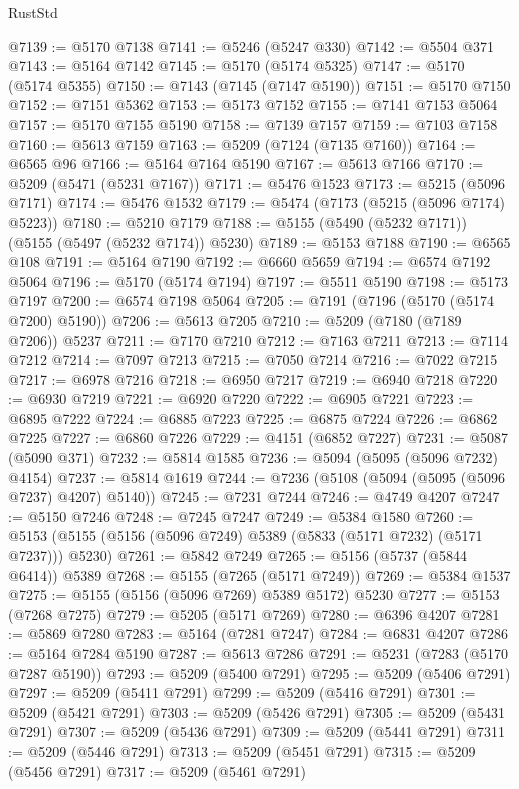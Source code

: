 \begin{lexlean}{RustStd}
\begin{coremodule}
@7139 := @5170 @7138
@7141 := @5246 (@5247 @330)
@7142 := @5504 @371
@7143 := @5164 @7142
@7145 := @5170 (@5174 @5325)
@7147 := @5170 (@5174 @5355)
@7150 := @7143 (@7145 (@7147 @5190))
@7151 := @5170 @7150
@7152 := @7151 @5362
@7153 := @5173 @7152
@7155 := @7141 @7153 @5064
@7157 := @5170 @7155 @5190
@7158 := @7139 @7157
@7159 := @7103 @7158
@7160 := @5613 @7159
@7163 := @5209 (@7124 (@7135 @7160))
@7164 := @6565 @96
@7166 := @5164 @7164 @5190
@7167 := @5613 @7166
@7170 := @5209 (@5471 (@5231 @7167))
@7171 := @5476 @1523
@7173 := @5215 (@5096 @7171)
@7174 := @5476 @1532
@7179 := @5474 (@7173 (@5215 (@5096 @7174) @5223))
@7180 := @5210 @7179
@7188 := @5155 (@5490 (@5232 @7171)) (@5155 (@5497 (@5232 @7174)) @5230)
@7189 := @5153 @7188
@7190 := @6565 @108
@7191 := @5164 @7190
@7192 := @6660 @5659
@7194 := @6574 @7192 @5064
@7196 := @5170 (@5174 @7194)
@7197 := @5511 @5190
@7198 := @5173 @7197
@7200 := @6574 @7198 @5064
@7205 := @7191 (@7196 (@5170 (@5174 @7200) @5190))
@7206 := @5613 @7205
@7210 := @5209 (@7180 (@7189 @7206)) @5237
@7211 := @7170 @7210
@7212 := @7163 @7211
@7213 := @7114 @7212
@7214 := @7097 @7213
@7215 := @7050 @7214
@7216 := @7022 @7215
@7217 := @6978 @7216
@7218 := @6950 @7217
@7219 := @6940 @7218
@7220 := @6930 @7219
@7221 := @6920 @7220
@7222 := @6905 @7221
@7223 := @6895 @7222
@7224 := @6885 @7223
@7225 := @6875 @7224
@7226 := @6862 @7225
@7227 := @6860 @7226
@7229 := @4151 (@6852 @7227)
@7231 := @5087 (@5090 @371)
@7232 := @5814 @1585
@7236 := @5094 (@5095 (@5096 @7232) @4154)
@7237 := @5814 @1619
@7244 := @7236 (@5108 (@5094 (@5095 (@5096 @7237) @4207) @5140))
@7245 := @7231 @7244
@7246 := @4749 @4207
@7247 := @5150 @7246
@7248 := @7245 @7247
@7249 := @5384 @1580
@7260 := @5153 (@5155 (@5156 (@5096 @7249) @5389 (@5833 (@5171 @7232) (@5171 @7237))) @5230)
@7261 := @5842 @7249
@7265 := @5156 (@5737 (@5844 @6414)) @5389
@7268 := @5155 (@7265 (@5171 @7249))
@7269 := @5384 @1537
@7275 := @5155 (@5156 (@5096 @7269) @5389 @5172) @5230
@7277 := @5153 (@7268 @7275)
@7279 := @5205 (@5171 @7269)
@7280 := @6396 @4207
@7281 := @5869 @7280
@7283 := @5164 (@7281 @7247)
@7284 := @6831 @4207
@7286 := @5164 @7284 @5190
@7287 := @5613 @7286
@7291 := @5231 (@7283 (@5170 @7287 @5190))
@7293 := @5209 (@5400 @7291)
@7295 := @5209 (@5406 @7291)
@7297 := @5209 (@5411 @7291)
@7299 := @5209 (@5416 @7291)
@7301 := @5209 (@5421 @7291)
@7303 := @5209 (@5426 @7291)
@7305 := @5209 (@5431 @7291)
@7307 := @5209 (@5436 @7291)
@7309 := @5209 (@5441 @7291)
@7311 := @5209 (@5446 @7291)
@7313 := @5209 (@5451 @7291)
@7315 := @5209 (@5456 @7291)
@7317 := @5209 (@5461 @7291)

\end{coremodule}
\end{lexlean}
